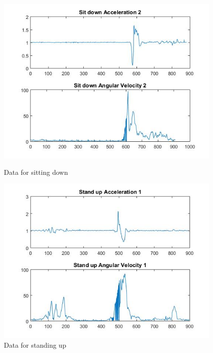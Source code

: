 \documentclass[letterpaper,12pt,titlepage,oneside,final]{book}
\begin{document}
\clearpage
\begin{figure}
	\centering
	\hspace{-1cm}
		\begin{minipage}[b]{0.5\textwidth}
		\centering
		\includegraphics[scale=0.42]{sit_2}
		\caption{Data for sitting down}
	\end{minipage}	
	\hfill
	\begin{minipage}[b]{0.5\textwidth}
		\centering
		\includegraphics[scale=0.42]{stand_up_1}
		\caption{Data for standing up}
	\end{minipage}%
\end{figure}
\end{document}
